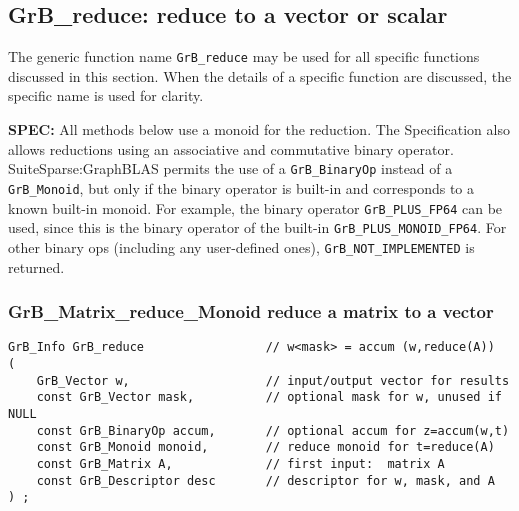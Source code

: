 \documentclass[12pt]{article}
\begin{document}
\newpage
\subsection{{\sf GrB\_reduce:} reduce to a vector or scalar} %
\label{reduce}

The generic function name \verb'GrB_reduce' may be used for all specific
functions discussed in this section.  When the details of a specific function
are discussed, the specific name is used for clarity.

\begin{alert}
{\bf SPEC:}
All methods below use a monoid for the reduction.  The Specification also
allows reductions using an associative and commutative binary operator.
SuiteSparse:GraphBLAS permits the use of a \verb'GrB_BinaryOp' instead of a
\verb'GrB_Monoid', but only if the binary operator is built-in and corresponds
to a known built-in monoid.  For example, the binary operator
\verb'GrB_PLUS_FP64' can be used, since this is the binary operator of the
built-in \verb'GrB_PLUS_MONOID_FP64'.  For other binary ops (including any
user-defined ones), \verb'GrB_NOT_IMPLEMENTED' is returned.

\end{alert}

\subsubsection{{\sf GrB\_Matrix\_reduce\_Monoid} reduce a matrix to a vector}
\label{reduce_to_vector}

\begin{mdframed}[userdefinedwidth=6in]
{\footnotesize
\begin{verbatim}
GrB_Info GrB_reduce                 // w<mask> = accum (w,reduce(A))
(
    GrB_Vector w,                   // input/output vector for results
    const GrB_Vector mask,          // optional mask for w, unused if NULL
    const GrB_BinaryOp accum,       // optional accum for z=accum(w,t)
    const GrB_Monoid monoid,        // reduce monoid for t=reduce(A)
    const GrB_Matrix A,             // first input:  matrix A
    const GrB_Descriptor desc       // descriptor for w, mask, and A
) ;
\end{verbatim} } \end{mdframed}
\end{document}
